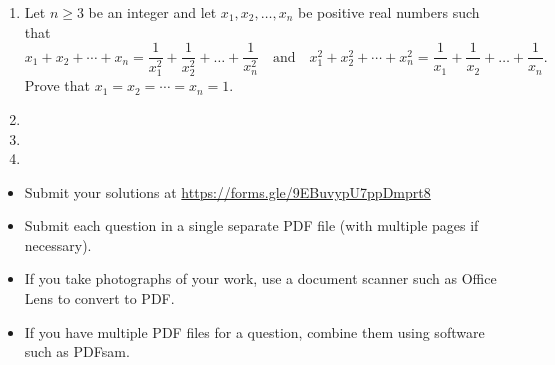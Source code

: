 \documentclass{article}
\begin{document}
\begin{enumerate}[itemsep=\fill]
\item %
Let $n \geq 3$ be an integer and let $x_1, x_2, \dotsc, x_n$ be positive real numbers such that
\[ x_1 + x_2 + \dotsb + x_n = \frac{1}{x_1^2} + \frac{1}{x_2^2} +\dotsc + \frac{1}{x_n^2} \quad \text{and} \quad x_1^2 + x_2^2 + \dotsb + x_n^2 = \frac{1}{x_1} + \frac{1}{x_2} +\dotsc + \frac{1}{x_n}. \]
Prove that $x_1 = x_2 = \dotsb = x_n =1$.


\item %


\item %


\item %

\end{enumerate}


\vfill
\small
\begin{itemize}
	\item Submit your solutions at \href{https://forms.gle/9EBuvypU7ppDmprt8}{https://forms.gle/9EBuvypU7ppDmprt8}
	\item Submit each question in a single separate PDF file (with multiple pages if necessary).
	\item If you take photographs of your work, use a document scanner such as Office Lens to convert to PDF.
	\item If you have multiple PDF files for a question, combine them using software such as PDFsam.
\end{itemize}


\end{document}
